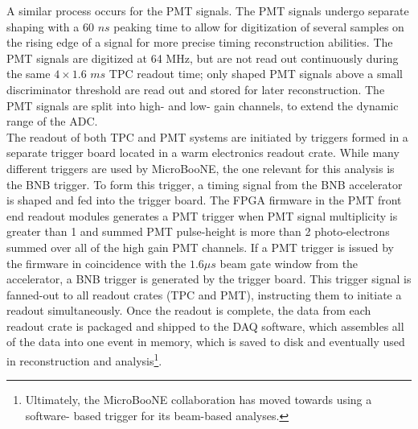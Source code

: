 A similar process occurs for the PMT signals. The PMT signals undergo separate shaping with a 60 $ns$ peaking time to allow for digitization of several samples on the rising edge of a signal for more precise timing reconstruction abilities. The PMT signals are digitized at 64 MHz, but are not read out continuously during the same $4 \times 1.6$ $ms$ TPC readout time; only shaped PMT signals above a small discriminator threshold are read out and stored for later reconstruction. The PMT signals are split into high- and low- gain channels, to extend the dynamic range of the ADC.\\

The readout of both TPC and PMT systems are initiated by triggers formed in a separate trigger board located in a warm electronics readout crate. While many different triggers are used by MicroBooNE, the one relevant for this analysis is the BNB trigger. To form this trigger, a timing signal from the BNB accelerator is shaped and fed into the trigger board. The FPGA firmware in the PMT front end readout modules generates a PMT trigger when PMT signal multiplicity is greater than 1 and summed PMT pulse-height is more than 2 photo-electrons summed over all of the high gain PMT channels. If a PMT trigger is issued by the firmware in coincidence with the $1.6 \mu s$ beam gate window from the accelerator, a BNB trigger is generated by the trigger board. This trigger signal is fanned-out to all readout crates (TPC and PMT), instructing them to initiate a readout simultaneously. Once the readout is complete, the data from each readout crate is packaged and shipped to the DAQ software, which assembles all of the data into one event in memory, which is saved to disk and eventually used in reconstruction and analysis\footnote{Ultimately, the MicroBooNE collaboration has moved towards using a software- based trigger for its beam-based analyses.}.

